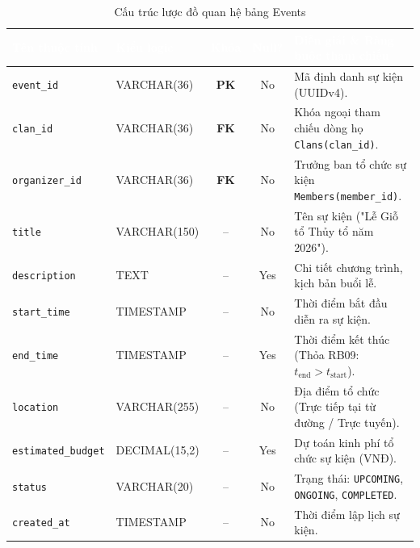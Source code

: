 \begin{table}[H]
    \centering
    \small
    \renewcommand{\arraystretch}{1.2}
    \begin{tabularx}{\textwidth}{p{3.2cm} p{2.6cm} c c X}
        \toprule
        \rowcolor{tableheader}\textcolor{white}{\textbf{Tên thuộc tính}} & \textcolor{white}{\textbf{Kiểu logic}} & \textcolor{white}{\textbf{Khóa}} & \textcolor{white}{\textbf{Null?}} & \textcolor{white}{\textbf{Diễn giải \& Ràng buộc tham chiếu}} \\
        \midrule
        \rowcolor{tablerowalt}
        \texttt{event\_id} & VARCHAR(36) & \textcolor{pkcolor}{\textbf{PK}} & No & Mã định danh sự kiện (UUIDv4). \\
        \texttt{clan\_id} & VARCHAR(36) & \textcolor{fkcolor}{\textbf{FK}} & No & Khóa ngoại tham chiếu dòng họ \texttt{Clans(clan\_id)}. \\
        \rowcolor{tablerowalt}
        \texttt{organizer\_id} & VARCHAR(36) & \textcolor{fkcolor}{\textbf{FK}} & No & Trưởng ban tổ chức sự kiện \texttt{Members(member\_id)}. \\
        \texttt{title} & VARCHAR(150) & -- & No & Tên sự kiện ("Lễ Giỗ tổ Thủy tổ năm 2026"). \\
        \rowcolor{tablerowalt}
        \texttt{description} & TEXT & -- & Yes & Chi tiết chương trình, kịch bản buổi lễ. \\
        \texttt{start\_time} & TIMESTAMP & -- & No & Thời điểm bắt đầu diễn ra sự kiện. \\
        \rowcolor{tablerowalt}
        \texttt{end\_time} & TIMESTAMP & -- & Yes & Thời điểm kết thúc (Thỏa RB09: $t_{\text{end}} > t_{\text{start}}$). \\
        \texttt{location} & VARCHAR(255) & -- & No & Địa điểm tổ chức (Trực tiếp tại từ đường / Trực tuyến). \\
        \rowcolor{tablerowalt}
        \texttt{estimated\_budget} & DECIMAL(15,2) & -- & Yes & Dự toán kinh phí tổ chức sự kiện (VNĐ). \\
        \texttt{status} & VARCHAR(20) & -- & No & Trạng thái: \texttt{UPCOMING}, \texttt{ONGOING}, \texttt{COMPLETED}. \\
        \rowcolor{tablerowalt}
        \texttt{created\_at} & TIMESTAMP & -- & No & Thời điểm lập lịch sự kiện. \\
        \bottomrule
    \end{tabularx}
    \caption{Cấu trúc lược đồ quan hệ bảng Events}
    \label{tab:schema_events}
\end{table}

